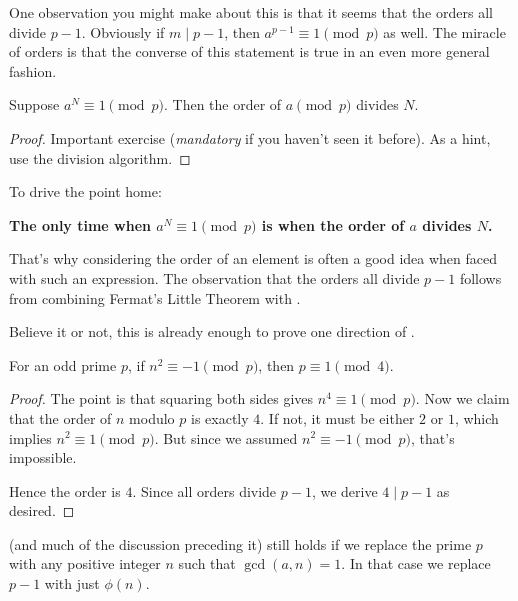 \documentclass[11pt]{scrartcl}
\begin{document}
One observation you might make about this is that it seems that the orders all divide $p-1$.
Obviously if $m \mid p-1$, then $a^{p-1} \equiv 1 \pmod p$ as well.
The miracle of orders is that the converse of this statement is true in an even more general fashion.

\begin{theorem}
  Suppose $a^N \equiv 1 \pmod p$.
  Then the order of $a \pmod p$ divides $N$.
  \label{thm:fundamental_order}
\end{theorem}
\begin{proof}
  Important exercise (\emph{mandatory} if you haven't seen it before).
  As a hint, use the division algorithm.
\end{proof}

To drive the point home:
\begin{center}
  \begin{minipage}[h]{9cm}
    \begin{tcolorbox}[plainbox]
    \bfseries
    \color{magenta}
    The only time when $a^N \equiv 1 \pmod p$ is when the order of $a$ divides $N$.
    \end{tcolorbox}
  \end{minipage}
\end{center}
That's why considering the order of an element is often a good idea when faced with such an expression.
The observation that the orders all divide $p-1$ follows from combining
Fermat's Little Theorem with .

Believe it or not, this is already enough to prove one direction of .

\begin{proposition}
  For an odd prime $p$, if $n^2 \equiv -1 \pmod p$, then $p \equiv 1 \pmod 4$.
\end{proposition}
\begin{proof}
  The point is that squaring both sides gives $n^4 \equiv 1 \pmod p$.
  Now we claim that the order of $n$ modulo $p$ is exactly $4$.
  If not, it must be either $2$ or $1$, which implies $n^2 \equiv 1 \pmod p$.
  But since we assumed $n^2 \equiv -1 \pmod p$, that's impossible.

  Hence the order is $4$.
  Since all orders divide $p-1$, we derive $4 \mid p-1$ as desired.
\end{proof}

\begin{remark*}
   (and much of the discussion preceding it)
  still holds if we replace the prime $p$ with
  any positive integer $n$ such that $\gcd(a,n) = 1$.
  In that case we replace $p-1$ with just $\phi(n)$.
\end{remark*}
\end{document}
